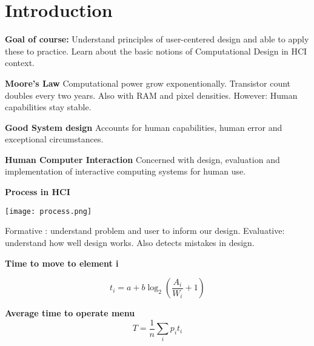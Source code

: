 \section{Introduction}

\textbf{Goal of course:} Understand principles of user-centered design and able to apply these to practice.
Learn about the basic notions of Computational Design in HCI context. \medskip


\textbf{Moore's Law}
Computational power grow exponentionally. Transistor count doubles every two years. Also with RAM and pixel densities. 
However: Human capabilities stay stable.\medskip

\textbf{Good System design}
Accounts for human capabilities, human error and exceptional circumstances. \medskip

\textbf{Human Computer Interaction}
Concerned with design, evaluation and implementation of interactive computing systems for human use. \medskip

\textbf{Process in HCI}

\begin{center}
	\texttt{[image: process.png]}
\end{center}

Formative : understand problem and user to inform our design. \medskip
Evaluative: understand how well design works. Also detects mistakes in design. \medskip

\textbf{Time to move to element i}

$$t_i = a + b \log_2\left(\frac{A_i}{W_i} + 1\right)$$


\textbf{Average time to operate menu}
$$T = \frac{1}{n} \sum_{i} p_i t_i$$
